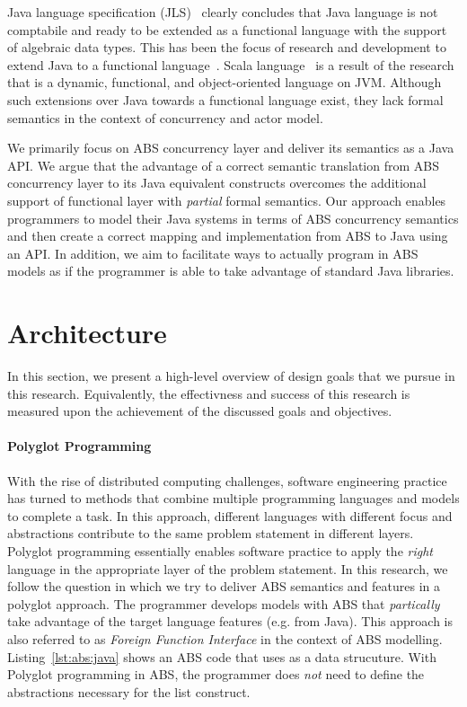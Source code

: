 Java language specification (JLS)~\cite{gosling2000java} clearly concludes that Java language is not comptabile and ready to be extended as a functional language with the support of algebraic data types.
This has been the focus of research and development to extend Java to a functional language~\cite{odersky1997pizza,henkel2003discovering,nystrom2003polyglot,bracha1998making}.
Scala language~\cite{odersky2004scala} is a result of the research that is a dynamic, functional, and object-oriented language on JVM.
Although such extensions over Java towards a functional language exist, they lack formal semantics in the context of concurrency and actor model.

We primarily focus on ABS concurrency layer and deliver its semantics as a Java API.
We argue that the advantage of a correct semantic translation from ABS concurrency layer to its Java equivalent constructs overcomes the additional support of functional layer with \emph{partial} formal semantics.
Our approach enables programmers to model their Java systems in terms of ABS concurrency semantics and then create a correct mapping and implementation from ABS to Java using an API.
In addition, we aim to facilitate ways to actually program in ABS models as if the programmer is able to take advantage of standard Java libraries.

\section{Architecture}
\label{sec:intro:arch:crit}

In this section, we present a high-level overview of design goals that we pursue in this research. 
Equivalently, the effectivness and success of this research is measured upon the achievement of the discussed goals and objectives. 

\paragraph{Polyglot Programming}
With the rise of distributed computing challenges, software engineering practice has turned to methods that combine multiple programming languages and models to complete a task. 
In this approach, different languages with different focus and abstractions contribute to the same problem statement in different layers. 
Polyglot programming essentially enables software practice to apply the \emph{right} language in the appropriate layer of the problem statement. 
In this research, we follow the question in which we try to deliver ABS semantics and features in a polyglot approach. 
The programmer develops models with ABS that \emph{partically} take advantage of the target language features (e.g. from Java).
This approach is also referred to as \emph{Foreign Function Interface} in the context of ABS modelling.
Listing~\ref{lst:abs:java} shows an ABS code that uses  as a data strucuture.
With Polyglot programming in ABS, the programmer does \emph{not} need to define the abstractions necessary for the list construct. 

